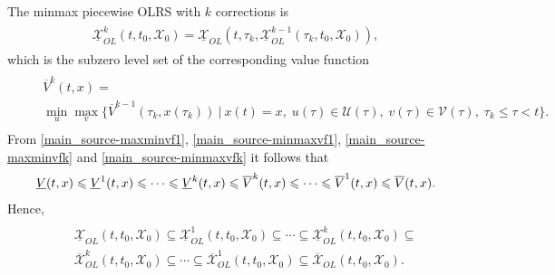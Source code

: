 \documentclass[letterpaper,10pt,english]{sphinxmanual}
\begin{document}
The minmax piecewise OLRS with $k$ corrections is
\label{main_source:equation-minmaxk}\begin{gather}
\begin{split}\underline{{\mathcal X}}_{OL}^k(t, t_0, {\mathcal X}_0) =
\underline{{\mathcal X}}_{OL}(t, \tau_k, \underline{{\mathcal X}}_{OL}^{k-1}(\tau_k, t_0, {\mathcal X}_0)),\end{split}\label{main_source-minmaxk}
\end{gather}
which is the subzero level set of the corresponding value function
\label{main_source:equation-minmaxvfk}\begin{gather}
\begin{split}\begin{aligned}
&&\overline{V}^k(t, x) = \nonumber \\
&&\min_u\max_v\{\overline{V}^{k-1}(\tau_k, x(\tau_k)) ~|~ x(t)=x, \;
u(\tau)\in{\mathcal U}(\tau), \; v(\tau)\in{\mathcal V}(\tau), \; \tau_k\leqslant\tau<t\}.
\end{aligned}\end{split}\label{main_source-minmaxvfk}
\end{gather}
From \eqref{main_source-maxminvf1}, \eqref{main_source-minmaxvf1}, \eqref{main_source-maxminvfk} and \eqref{main_source-minmaxvfk} it
follows that
\begin{gather}
\begin{split}\underline{V}(t, x) \leqslant\underline{V}^1(t, x)\leqslant\cdots
\leqslant\underline{V}^k(t, x) \leqslant\overline{V}^k(t, x) \leqslant\cdots
\leqslant\overline{V}^1(t, x) \leqslant\overline{V}(t, x) .\end{split}\notag
\end{gather}
Hence,
\label{main_source:equation-olrsinclusion}\begin{gather}
\begin{split}\begin{aligned}
&&\underline{{\mathcal X}}_{OL}(t, t_0, {\mathcal X}_0) \subseteq \underline{{\mathcal X}}_{OL}^1(t, t_0, {\mathcal X}_0) \subseteq \cdots
\subseteq \underline{{\mathcal X}}_{OL}^k(t, t_0, {\mathcal X}_0) \subseteq \nonumber \\
&&\overline{{\mathcal X}}_{OL}^k(t, t_0, {\mathcal X}_0) \subseteq \cdots \subseteq \overline{{\mathcal X}}_{OL}^1(t, t_0, {\mathcal X}_0)
\subseteq \overline{{\mathcal X}}_{OL}(t, t_0, {\mathcal X}_0) .
\end{aligned}\end{split}\label{main_source-olrsinclusion}
\end{gather}
\end{document}
